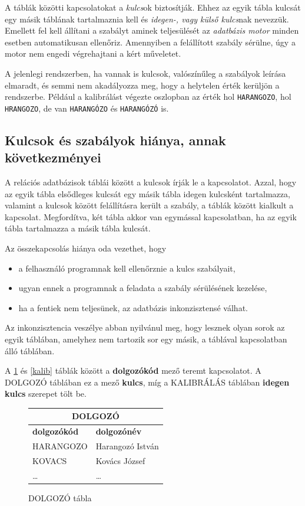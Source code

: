 \documentclass[a4paper,12pt]{report}
\begin{document}
A táblák közötti kapcsolatokat a \textit{kulcs}ok biztosítják. Ehhez az egyik 
tábla kulcsát egy másik táblának tartalmaznia kell és \textit{idegen-, vagy 
külső kulcs}nak nevezzük. Emellett fel kell állítani a szabályt aminek 
teljesülését az \textit{adatbázis motor} minden esetben automatikusan ellenőriz. 
Amennyiben a felállított szabály sérülne, úgy a motor nem engedi végrehajtani a 
kért műveletet.

A jelenlegi rendszerben, ha vannak is kulcsok, valószínűleg a szabályok leírása 
elmaradt, és semmi nem akadályozza meg, hogy a helytelen érték kerüljön a 
rendszerbe. Például a kalibrálást végezte oszlopban az érték hol 
\texttt{HARANGOZO}, hol \texttt{HRANGOZO}, de van \texttt{HARANGÓZO} és 
\texttt{HARANGÓZÓ} is.

\subsection{Kulcsok és szabályok hiánya, annak következményei}
A relációs adatbázisok táblái között a kulcsok írják le a kapcsolatot. Azzal, 
hogy az egyik tábla elsődleges kulcsát egy másik tábla idegen kulcsként 
tartalmazza, valamint a kulcsok között felállításra került a szabály, a táblák 
között kialkult a kapcsolat. Megfordítva, két tábla akkor van egymással 
kapcsolatban, ha az egyik tábla tartalmazza a másik tábla kulcsát.

Az összekapcsolás hiánya oda vezethet, hogy
\begin{itemize}
\item a felhasználó programnak kell ellenőrznie a kulcs szabályait,
\item ugyan ennek a programnak a feladata a szabály sérülésének kezelése,
\item ha a fentiek nem teljesünek, az adatbázis inkonzisztensé válhat.
\end{itemize}

Az inkonzisztencia veszélye abban nyilvánul meg, hogy lesznek olyan sorok az 
egyik táblában, amelyhez nem tartozik sor egy másik, a táblával kapcsolatban 
álló táblában.

A \ref{dolg} és \ref{kalib} táblák között a \textbf{dolgozókód} mező teremt
kapcsolatot. A DOLGOZÓ táblában ez a mező \textbf{kulcs}, míg a KALIBRÁLÁS 
táblában \textbf{idegen kulcs} szerepet tölt be.

\begin{figure}[ht!] \centering
\begin{tabular}{|l|l|}
        \hline
        \multicolumn{2}{|c|}{\textbf{DOLGOZÓ}}\\
        \hline
        \textbf{dolgozókód}&\textbf{dolgozónév}\\
        \hline
        HARANGOZO&Harangozó István\\
        \hline
        KOVACS&Kovács József\\
        \hline
        \dots&\dots\\
        \end{tabular}
        \caption{DOLGOZÓ tábla}\label{dolg}
\end{figure}
\end{document}

